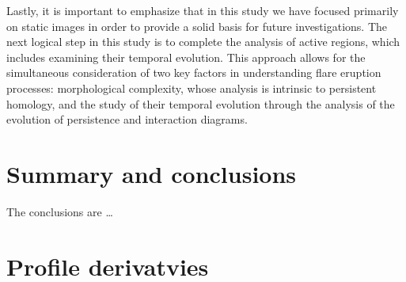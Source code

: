 \documentclass[12pt]{mythesis}
\begin{document}
Lastly, it is important to emphasize that in this study we have focused primarily on static images in order to provide a solid basis for future investigations. The next logical step in this study is to complete the analysis of active regions, which includes examining their temporal evolution. This approach allows for the simultaneous consideration of two key factors in understanding flare eruption processes: morphological complexity, whose analysis is intrinsic to persistent homology, and the study of their temporal evolution through the analysis of the evolution of persistence and interaction diagrams.


\chapter{Summary and conclusions}

The conclusions are \dots

\appendix

\chapter{Profile derivatvies}



\cleardoublepage
\layout
\end{document}
